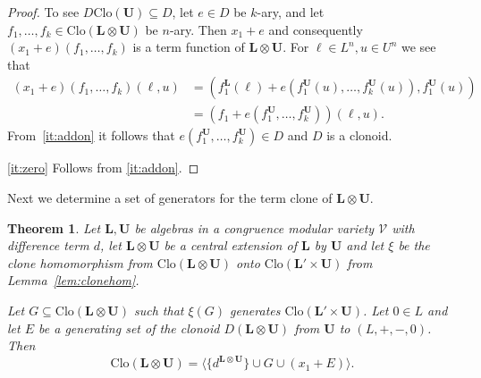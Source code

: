\documentclass[10pt,a4paper]{amsart}
\numberwithin{equation}{section}
\newtheorem{theorem}{Theorem}[section]
\renewcommand{\L}{\mathbf{L}}
\newcommand{\U}{\mathbf{U}}
\newcommand{\V}{\mathcal{V}}
\newcommand{\Clo}{\mathrm{Clo}}
\begin{document}
\begin{proof}
  To see $D\Clo(\U) \subseteq D$, let $e\in D$ be $k$-ary, and let $f_1,\dots,f_k\in\Clo(\L\otimes\U)$ be $n$-ary.
  Then $x_1+e$ and consequently $(x_1+e)(f_1,\dots,f_k)$ is a term function of $\L\otimes\U$.
  For $\ell\in L^n,u\in U^n$ we see that
    \begin{align*}
      (x_1+e)(f_1,\dots,f_k)(\ell,u) & = (f^\L_1(\ell)+ e(f_1^\U(u),\dots,f^\U_k(u)), f_1^\U(u) ) \\
      & = (f_1+ e(f_1^\U,\dots,f^\U_k)) (\ell,u).           
    \end{align*}
  From~\eqref{it:addon} it follows that $e(f_1^\U,\dots,f^\U_k)  \in D$ and $D$ is a clonoid.
 
  \eqref{it:zero} 
    Follows from \eqref{it:addon}.
\end{proof}

Next we determine a set of generators for the term clone of $\L \otimes \U$. 


\begin{theorem} \label{thm:clonegens}
  Let $\L,\U$ be algebras in a congruence modular variety $\V$ with difference term $d$, 
    let $\L\otimes\U$ be a central extension of $\L$ by $\U$ and let $\xi$ be the clone 
    homomorphism from $\Clo(\L\otimes\U)$ onto $\Clo(\L'\times\U)$ from Lemma~\ref{lem:clonehom}.
 
  Let $G \subseteq \Clo(\L\otimes\U)$ such that $\xi(G)$ generates $\Clo(\L'\times\U)$.
  Let $0 \in L$ and let $E$ be a generating set of
    the clonoid $D(\L\otimes\U)$ from $\U$ to $(L, +, -, 0)$.
  Then
    \[ \Clo(\L\otimes\U) = \langle \{d^{\L\otimes\U}\} \cup G \cup (x_1+E) \rangle. \]
\end{theorem}
\end{document}
